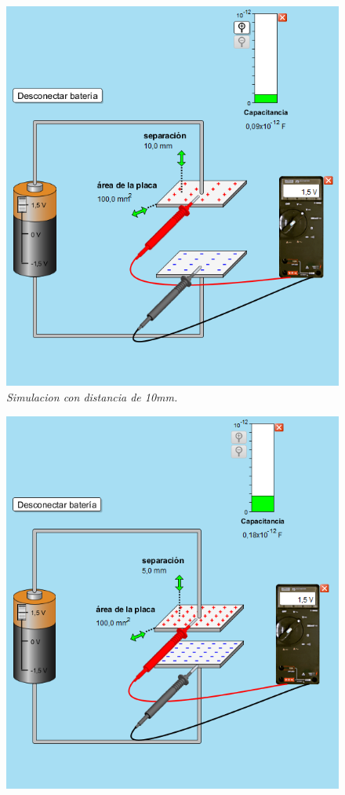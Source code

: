 \documentclass[12pt]{report}
\begin{document}
\begin{enumerate}
    \begin{figure}[h]
        \centering
        \begin{minipage}[h]{0.45\textwidth}
        \centering
        \includegraphics[width=1\textwidth]{./images/1FOTO5.png}
        \textit{Simulacion con distancia de 10mm.} 
        \end{minipage}\hskip 1cm
        \begin{minipage}[h]{0.45\textwidth}
        \centering
        \includegraphics[width=1\textwidth]{./images/1FOTO6.png}

\end{minipage}
\end{figure}
\end{enumerate}
\end{document}
